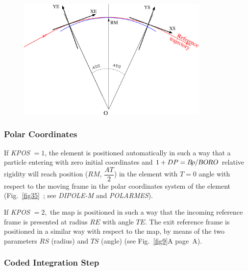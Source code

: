 \begin{figure}[h]
\begin{center}
\vspace{10ex}

\includegraphics[height=6cm]{Fig35.eps}
\end{center}

\vfill
\end{figure}


\medskip





\clearpage 

 \subsubsection*{Polar Coordinates} 
 
 If  \textsl{KPOS} $=1$,  the element is positioned automatically in such a way
that a particle entering with zero initial coordinates and 
$ 1+DP=B\!\rho /\textsl{BORO} $ 
relative rigidity will reach position ($ RM$, $\dfrac{AT }{ 2} $) in 
the element with $ T=0 $ angle with respect to the moving frame in the polar 
coordinates system of the element (Fig.~\ref{fig35}~; 
see \textsl{DIPOLE-M} and \textsl{POLARMES}).

\noindent If  \textsl{KPOS} $=2, $ the map is positioned in such a way that the 
incoming reference frame is presented  at radius $ RE $ with angle $ TE $.  
The exit reference frame  is positioned in a similar way with 
respect to the map,  by means of 
the two parameters $ RS $ (radius) and $ TS $ (angle) (see Fig.~\ref{fig9}A page~\pageref{fig9}A).  






 \subsubsection{Coded Integration Step} 

